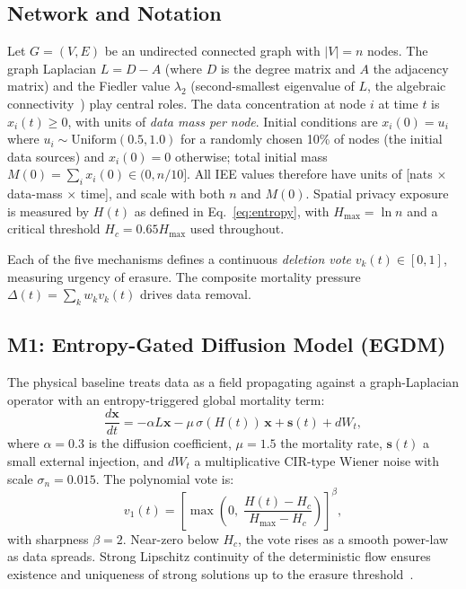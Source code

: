 \documentclass[review,12pt]{elsarticle}
\newcommand{\bfx}{\mathbf{x}}
\newcommand{\Hc}{H_c}
\newcommand{\Hmax}{H_{\max}}
\newcommand{\lambdat}{\lambda_2}
\begin{document}
\subsection{Network and Notation}

Let $G = (V, E)$ be an undirected connected graph with $|V| = n$ nodes. The
graph Laplacian $L = D - A$ (where $D$ is the degree matrix and $A$ the
adjacency matrix) and the Fiedler value $\lambdat$ (second-smallest eigenvalue
of $L$, the algebraic connectivity~\cite{chung1997spectral}) play central roles.
The data concentration at node $i$ at time $t$ is $x_i(t) \geq 0$, with units
of \emph{data mass per node}.  Initial conditions are $x_i(0) = u_i$ where
$u_i \sim \mathrm{Uniform}(0.5, 1.0)$ for a randomly chosen 10\% of nodes
(the initial data sources) and $x_i(0) = 0$ otherwise; total initial mass
$M(0) = \sum_i x_i(0) \in (0, n/10]$.  All IEE values therefore have units
of [nats $\times$ data-mass $\times$ time], and scale with both $n$ and $M(0)$.
Spatial privacy exposure is measured by $H(t)$ as defined in Eq.~\eqref{eq:entropy},
with $\Hmax = \ln n$ and a critical threshold $\Hc = 0.65 \Hmax$ used throughout.

Each of the five mechanisms defines a continuous \emph{deletion vote}
$v_k(t) \in [0,1]$, measuring urgency of erasure. The composite mortality
pressure $\Delta(t) = \sum_k w_k v_k(t)$ drives data removal.

\subsection{M1: Entropy-Gated Diffusion Model (EGDM)}

The physical baseline treats data as a field propagating against a
graph-Laplacian operator with an entropy-triggered global mortality term:
\begin{equation}
  \frac{d\bfx}{dt} = -\alpha L\bfx - \mu\,\sigma(H(t))\,\bfx
                     + \mathbf{s}(t) + dW_t,
  \label{eq:egdm}
\end{equation}
where $\alpha = 0.3$ is the diffusion coefficient, $\mu = 1.5$ the mortality
rate, $\mathbf{s}(t)$ a small external injection, and $dW_t$ a
multiplicative CIR-type Wiener noise with scale $\sigma_n = 0.015$.
The polynomial vote is:
\begin{equation}
  v_1(t) = \left[\max\!\left(0,\;\frac{H(t) - \Hc}{\Hmax - \Hc}\right)\right]^{\!\beta},
  \label{eq:v1}
\end{equation}
with sharpness $\beta = 2$. Near-zero below $\Hc$, the vote rises as a
smooth power-law as data spreads. Strong Lipschitz continuity of the
deterministic flow ensures existence and uniqueness of strong solutions
up to the erasure threshold~\cite{oksendal2003stochastic}.
\end{document}
